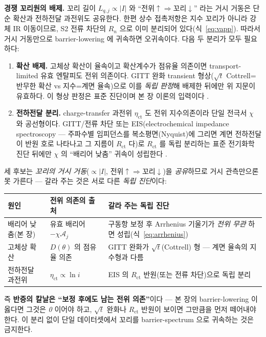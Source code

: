 \documentclass[11pt,a4paper]{article}
\begin{document}
\textbf{경쟁 꼬리원의 배제.} 꼬리 길이 $L_{q,j}\propto|I|$ 와 ``전위$\uparrow\Rightarrow$꼬리$\downarrow$''
라는 거시 거동은 단순 확산과 전하전달 과전위도 공유한다. 한편 상수 접촉저항은 지수 꼬리가 아니라 강체 IR
이동이므로, S2 전류 차단의 $R_n$ 으로 이미 분리되어 있다(식~\eqref{eq:vapp}). 따라서 거시 거동만으로
barrier-lowering 에 귀속하면 오귀속이다. 다음 두 분리가 모두 필요하다:
\begin{enumerate}[label=(\roman*),leftmargin=2.0em,itemsep=2pt]
\item \textbf{확산 배제.} 고체상 확산이 율속이고 확산계수가 점유율 의존이면 transport-limited 유효 엔탈피도 전위
  의존이다. GITT 완화 transient 형상($\sqrt t$ Cottrell=반무한 확산 vs 지수=계면 율속)으로 이를 \emph{독립 판정}해
  배제한 뒤에만 위 지문이 유효하다. 이 형상 판정은 표준 진단이며 본 장 이론의 입력이다 \cite{weppner1977}.
\item \textbf{전하전달 분리.} charge-transfer 과전위 $\eta_\mathrm{ct}$ 도 전위 지수의존이라 단일 전극서 $\chi$ 와
  공선형이다. GITT/전류 차단 또는 EIS(electrochemical impedance spectroscopy — 주파수별 임피던스를
  복소평면(Nyquist)에 그리면 계면 전하전달이 반원 호로 나타나고 그 지름이 $R_\mathrm{ct}$ 다)로
  $R_\mathrm{ct}$ 를 독립 분리하는 표준 전기화학 진단 뒤에만 $\chi$ 의
  ``배리어 낮춤'' 귀속이 성립한다 \cite{weppner1977,bardfaulkner}.
\end{enumerate}
세 후보는 \emph{꼬리의 거시 거동}($\propto|I|$, 전위$\uparrow\Rightarrow$꼬리$\downarrow$)을 \emph{공유}하므로
거시 관측만으론 못 가른다 — 갈라 주는 것은 서로 다른 \emph{독립 진단}이다:
\begin{center}
\renewcommand{\arraystretch}{1.35}
\begin{tabular}{p{} p{} p{}}
\toprule
원인 & 전위 의존의 출처 & 갈라 주는 독립 진단 \\
\midrule
배리어 낮춤(본 장) & 유효 배리어 $-\chi\mathcal A_j$ & 구동항 보정 후 Arrhenius 기울기가 \emph{전위 무관} 하면 성립(식~\eqref{eq:arrhenius}) \\
고체상 확산 & $D(\theta)$ 의 점유율 의존 & GITT 완화가 $\sqrt t$(Cottrell) 형 — 계면 율속의 지수형과 다름 \\
전하전달 과전위 & $\eta_\mathrm{ct}\propto\ln i$ & EIS 의 $R_\mathrm{ct}$ 반원(또는 전류 차단)으로 독립 분리 \\
\bottomrule
\end{tabular}
\end{center}
즉 \textbf{반증의 칼날은 ``보정 후에도 남는 전위 의존''}이다 — 본 장의 barrier-lowering 이 옳다면 그것은 \emph{0}
이어야 하고, $\sqrt t$ 완화나 $R_\mathrm{ct}$ 반원이 보이면 그만큼을 먼저 떼어내야 한다. 이 분리 없이 단일
데이터셋에서 꼬리를 barrier-spectrum 으로 귀속하는 것은 금지한다.
\end{document}
